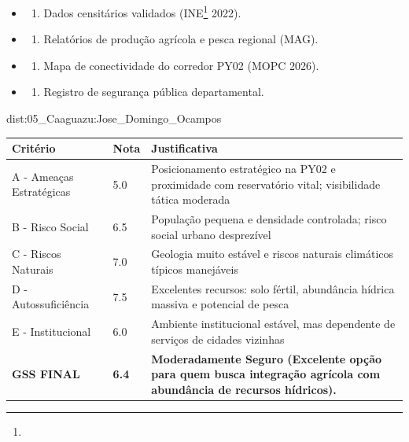 {\begin{itemize}
\tightlist
\item
  \begin{enumerate}
  \def\labelenumi{\arabic{enumi})}
  \tightlist
  \item
    Dados censitários validados (INE\footnote{\fineINE} 2022).
  \end{enumerate}
\item
  \begin{enumerate}
  \def\labelenumi{\arabic{enumi})}
  \setcounter{enumi}{1}
  \tightlist
  \item
    Relatórios de produção agrícola e pesca regional (MAG).
  \end{enumerate}
\item
  \begin{enumerate}
  \def\labelenumi{\arabic{enumi})}
  \setcounter{enumi}{2}
  \tightlist
  \item
    Mapa de conectividade do corredor PY02 (MOPC 2026).
  \end{enumerate}
\item
  \begin{enumerate}
  \def\labelenumi{\arabic{enumi})}
  \setcounter{enumi}{3}
  \tightlist
  \item
    Registro de segurança pública departamental.
  \end{enumerate}
\end{itemize}}{dist:05_Caaguazu:Jose_Domingo_Ocampos}
\begin{table}[ht!]
\small \begin{tabular}{p{3.0cm}p{0.8cm}p{6.0cm}} \toprule
\textbf{Critério} & \textbf{Nota} & \textbf{Justificativa} \\ \midrule
A - Ameaças Estratégicas & 5.0 & Posicionamento estratégico na PY02 e proximidade com reservatório vital; visibilidade tática moderada \\
B - Risco Social & 6.5 & População pequena e densidade controlada; risco social urbano desprezível \\
C - Riscos Naturais & 7.0 & Geologia muito estável e riscos naturais climáticos típicos manejáveis \\
D - Autossuficiência & 7.5 & Excelentes recursos: solo fértil, abundância hídrica massiva e potencial de pesca \\
E - Institucional & 6.0 & Ambiente institucional estável, mas dependente de serviços de cidades vizinhas \\
\midrule \textbf{GSS FINAL} & \textbf{6.4} & \textbf{Moderadamente Seguro (Excelente opção para quem busca integração agrícola com abundância de recursos hídricos).} \\ \bottomrule \end{tabular}
\end{table}
